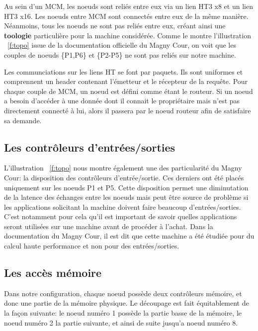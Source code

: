       Au sein d'un MCM, les noeuds sont reliés entre eux via un lien HT3 x8 et
      un lien HT3 x16. Les noeuds entre MCM sont connectés entre eux de la même
      manière. Néanmoins, tous les noeuds ne sont pas reliés entre eux, créant
      ainsi une \textbf{toologie} particulière pour la machine considérée. Comme
      le montre l'illustration ~\ref{f:topo} issue de la documentation
      officielle du Magny Cour, on voit que les couples de noeuds \{P1,P6\} et
      \{P2-P5\} ne sont pas reliés sur notre machine.


      Les communciations sur les liens HT se font par
      paquets\cite{CacheHierarchy}. Ils sont uniformes et comprennent un header
      contenant l'émetteur et le récepteur de la requête. Pour chaque couple de
      MCM, un noeud est défini comme étant le routeur. Si un noeud a besoin
      d'accéder à une donnée dont il connait le propriétaire mais n'est pas
      directement connecté à lui, alors il passera par le noeud routeur afin de
      satisfaire sa demande.

    \subsection{Les contrôleurs d'entrées/sorties}

      L'illustration ~\ref{f:topo} nous montre également une des particularité
      du Magny Cour: la disposition des contrôleurs d'entrée/sortie. Ces
      derniers ont été placés uniquement sur les noeuds P1 et P5. Cette
      disposition permet une diminutation de la latence des échanges entre les
      noeuds mais peut être source de problème si les applications solicitant la
      machine doivent faire beaucoup d'entrées/sorties. C'est notamment pour
      cela qu'il est important de savoir quelles applications seront utilisées
      sur une machine avant de procéder à l'achat. Dans la documentation du
      Magny Cour, il est dit que cette machine a été étudiée pour du calcul
      haute performance et non pour des entrées/sorties.

    \subsection{Les accès mémoire}

      Dans notre configuration, chaque noeud possède deux contrôleurs mémoire,
      et donc une partie de la mémoire physique. Le découpage est fait
      équitablement de la façon suivante: le noeud numéro 1 possède la partie
      basse de la mémoire, le noeud numéro 2 la partie suivante, et ainsi de
      suite jusqu'a noeud numéro 8.

